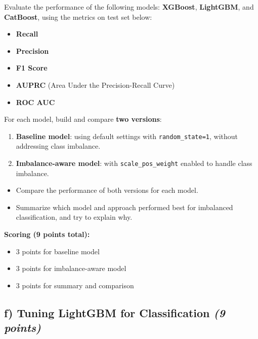 \documentclass[
  letterpaper,
  DIV=11,
  numbers=noendperiod]{scrreprt}
\providecommand{\tightlist}{%
  \setlength{\itemsep}{0pt}\setlength{\parskip}{0pt}}\usepackage{longtable,booktabs,array}
\begin{document}
Evaluate the performance of the following models: \textbf{XGBoost},
\textbf{LightGBM}, and \textbf{CatBoost}, using the metrics on test set
below:

\begin{itemize}
\tightlist
\item
  \textbf{Recall}
\item
  \textbf{Precision}
\item
  \textbf{F1 Score}
\item
  \textbf{AUPRC} (Area Under the Precision-Recall Curve)
\item
  \textbf{ROC AUC}
\end{itemize}

For each model, build and compare \textbf{two versions}:

\begin{enumerate}
\def\labelenumi{\arabic{enumi}.}
\tightlist
\item
  \textbf{Baseline model}: using default settings with
  \texttt{random\_state=1}, without addressing class imbalance.
\item
  \textbf{Imbalance-aware model}: with \texttt{scale\_pos\_weight}
  enabled to handle class imbalance.
\end{enumerate}

\begin{itemize}
\tightlist
\item
  Compare the performance of both versions for each model.
\item
  Summarize which model and approach performed best for imbalanced
  classification, and try to explain why.
\end{itemize}

\textbf{Scoring (9 points total):}

\begin{itemize}
\tightlist
\item
  3 points for baseline model\\
\item
  3 points for imbalance-aware model\\
\item
  3 points for summary and comparison
\end{itemize}

\subsection{\texorpdfstring{f) Tuning LightGBM for Classification
\emph{(9
points)}}{f) Tuning LightGBM for Classification (9 points)}}\label{f-tuning-lightgbm-for-classification-9-points}
\end{document}
